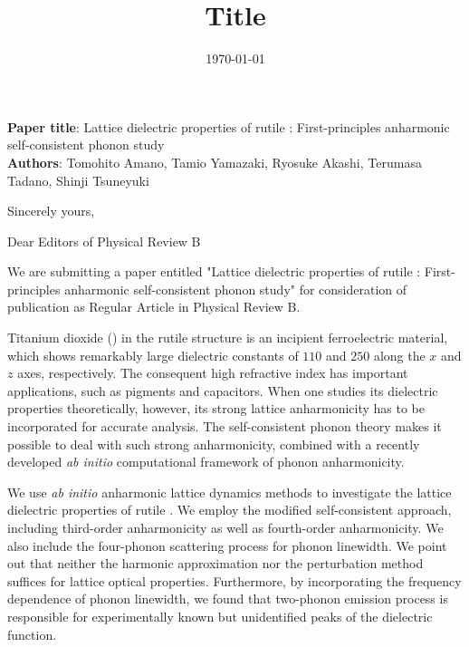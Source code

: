 \documentclass[12pt,a4paper, roman]{moderncv}        %
\title{Title}                               %
\begin{document}
\date{\today}
\opening{\textbf{Paper title}: Lattice dielectric properties of rutile : First-principles anharmonic self-consistent phonon study \\
\textbf{Authors}: Tomohito Amano, Tamio Yamazaki, Ryosuke Akashi, Terumasa Tadano, Shinji Tsuneyuki} 

\closing{Sincerely yours,}

\makelettertitle

% 
Dear Editors of Physical Review B

\vspace{0.5cm}


We are submitting a paper entitled "Lattice dielectric properties of rutile : First-principles anharmonic self-consistent phonon study" for consideration of publication as Regular Article in Physical Review B. 

\vspace{0.2cm}

Titanium dioxide () in the rutile structure is an incipient ferroelectric material, which shows remarkably large dielectric constants of $110$ and $250$ along the $x$ and $z$ axes, respectively. The consequent high refractive index has important applications, such as pigments and capacitors. When one studies its dielectric properties theoretically, however, its strong lattice anharmonicity has to be incorporated for accurate analysis. The self-consistent phonon theory makes it possible to deal with such strong anharmonicity, combined with a recently developed \textit{ab initio} computational framework of phonon anharmonicity.

\vspace{0.2cm}

We use \textit{ab initio} anharmonic lattice dynamics methods to investigate the lattice dielectric properties of rutile . We employ the modified self-consistent approach, including third-order anharmonicity as well as fourth-order anharmonicity. We also include the four-phonon scattering process for phonon linewidth. We point out that neither the harmonic approximation nor the perturbation method suffices for lattice optical properties. Furthermore, by incorporating the frequency dependence of phonon linewidth, we found that two-phonon emission process is responsible for experimentally known but unidentified peaks of the dielectric function.
\end{document}
